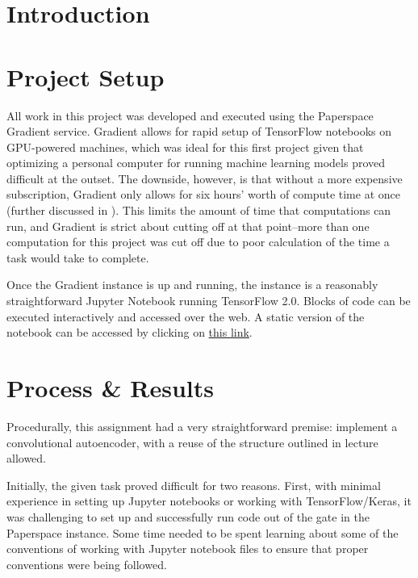 \documentclass{article}
\begin{document}
  
  \graphicspath{{./images/}}
\section{Introduction}

\section{Project Setup}
\par All work in this project was developed and executed using the Paperspace Gradient service.
Gradient allows for rapid setup of TensorFlow notebooks on GPU-powered machines, which was ideal for this first project given that optimizing a personal computer for running machine learning models proved difficult at the outset.
The downside, however, is that without a more expensive subscription, Gradient only allows for six hours' worth of compute time at once (further discussed in ).
This limits the amount of time that computations can run, and Gradient is strict about cutting off at that point--more than one computation for this project was cut off due to poor calculation of the time a task would take to complete.

\par Once the Gradient instance is up and running, the instance is a reasonably straightforward Jupyter Notebook running TensorFlow 2.0.
Blocks of code can be executed interactively and accessed over the web.
A static version of the notebook can be accessed by clicking on \href{https://console.paperspace.com/te7vzjiu3/notebook/prz0iko1d}{this link}.

\section{Process \& Results} \label{procresults}
\par Procedurally, this assignment had a very straightforward premise: implement a convolutional autoencoder, with a reuse of the structure outlined in lecture allowed.

\par Initially, the given task proved difficult for two reasons. 
First, with minimal experience in setting up Jupyter notebooks or working with TensorFlow/Keras, it was challenging to set up and successfully run code out of the gate in the Paperspace instance.
Some time needed to be spent learning about some of the conventions of working with Jupyter notebook files to ensure that proper conventions were being followed.
\end{document}
